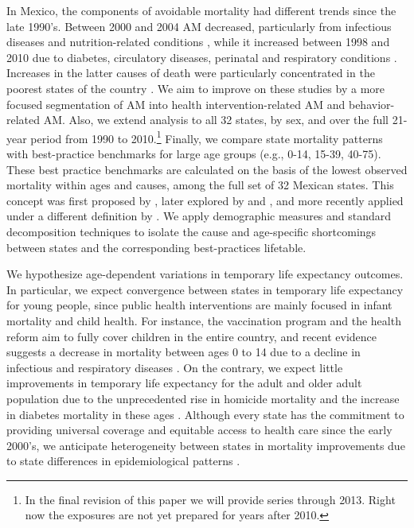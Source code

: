 \documentclass{article}
\begin{document}
In Mexico, the components of avoidable mortality had different trends since the
late 1990's. Between 2000 and 2004 AM decreased, particularly from
infectious diseases and nutrition-related conditions \citep{francomarina2006}, while it increased between 1998 and 2010 due to diabetes, circulatory diseases, perinatal and respiratory conditions
\citep{agudelo2014efecto}. Increases in the latter causes
of death were particularly concentrated in the poorest states of the country
\citep{davila2014mortalidad}. We aim to improve on these studies
by a more focused segmentation of AM into health intervention-related AM and
behavior-related AM. Also, we extend analysis to all 32 states, by sex, and over
the full 21-year period from 1990 to 2010.\footnote{In the final revision of
this paper we will provide series through 2013. Right now the exposures are not
yet prepared for years after 2010.} Finally, we compare state mortality patterns
with best-practice benchmarks for large age groups (e.g., 0-14, 15-39, 40-75). These best practice
benchmarks are calculated on the basis of the lowest observed mortality within
ages and causes, among the full set of 32 Mexican states. This concept was first
proposed by \citet{whelpton1947}, later explored by  \citet{wunsch1975minimum} and
\citet{vallin2008minimum}, and more recently applied under a different
definition by \citet{eikemo2014}. We apply demographic measures and
standard decomposition techniques to isolate the cause and age-specific shortcomings between states and the corresponding best-practices lifetable. 

We hypothesize age-dependent variations in temporary life expectancy outcomes.
In particular, we expect convergence between states in temporary life expectancy
for young people, since public health interventions are mainly focused in infant
mortality and child health. For instance, the vaccination program and the health
reform aim to fully cover children in the entire country, and recent
evidence suggests a decrease in mortality between ages 0 to 14 due to a decline
in infectious and respiratory diseases \citep{canudas2014}. On the contrary, we
expect little improvements in temporary life expectancy for the adult and older
adult population due to the unprecedented rise in homicide mortality and the
increase in diabetes mortality in these ages \citep{canudas2014}. Although every
state has the commitment to providing universal coverage and equitable access to
health care since the early 2000's, we anticipate heterogeneity between states
in mortality improvements due to state differences in epidemiological patterns
\citep{Frenk2006}.
\end{document}
